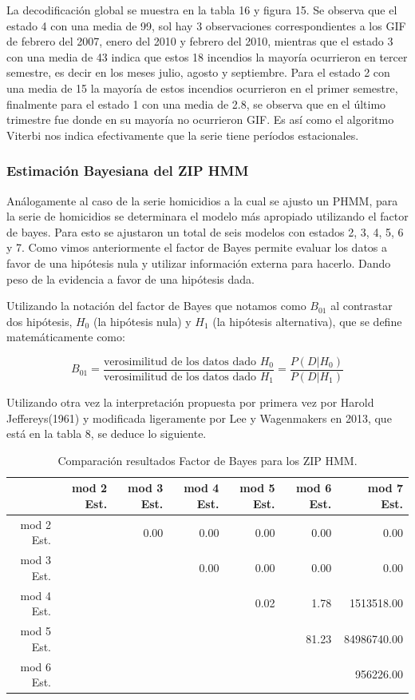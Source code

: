 \documentclass[a4paper]{article}\usepackage[]{graphicx}\usepackage[]{color}
\begin{document}
La decodificación global se muestra en la tabla 16 y figura 15. Se observa que el estado 4 con una media de 99, sol hay 3 observaciones correspondientes a los GIF de febrero del 2007, enero del 2010 y febrero del 2010, mientras que el estado 3 con una media de 43 indica que estos 18 incendios la mayoría ocurrieron en tercer semestre, es decir en los meses julio, agosto y septiembre. Para el estado 2 con una media de 15 la mayoría de estos incendios ocurrieron en el primer semestre, finalmente para el estado 1 con una media de 2.8, se observa que en el último trimestre fue donde en su mayoría no ocurrieron GIF. Es así como el algoritmo Viterbi nos indica efectivamente que la serie tiene períodos estacionales.





\vspace{5mm} %

\subsubsection*{Estimación Bayesiana del ZIP HMM}

Análogamente al caso de la serie homicidios a la cual se ajusto un PHMM, para la serie de homicidios se determinara el modelo más apropiado utilizando el factor de bayes. Para esto se ajustaron un total de seis modelos con estados 2, 3, 4, 5, 6 y 7. Como vimos anteriormente el factor de Bayes permite evaluar los datos a favor de una hipótesis nula y utilizar información externa para hacerlo. Dando peso de la evidencia a favor de una hipótesis dada.

Utilizando la notación del factor de Bayes que notamos como $B_{01}$ al contrastar dos hipótesis, $H_0$ (la hipótesis nula) y $H_1$ (la hipótesis alternativa), que se define matemáticamente como:

$$B_{01} = \frac{\text{verosimilitud de los datos dado $H_0$}}{\text{verosimilitud de los datos dado $H_1$}} = \frac{P(D | H_0)}{P(D | H_1)}$$

Utilizando otra vez la interpretación propuesta por primera vez por Harold Jeffereys(1961) y modificada ligeramente por Lee y Wagenmakers en 2013, que está en la tabla 8, se deduce lo siguiente.

\begin{table}[ht]
\centering
\begin{tabular}{rrrrrrr}
  \hline
 & mod 2 Est. & mod 3 Est. & mod 4 Est. & mod 5 Est. & mod 6 Est. & mod 7 Est. \\ 
  \hline
mod 2 Est. &  & 0.00 & 0.00 & 0.00 & 0.00 & 0.00 \\ 
  mod 3 Est. &  &  & 0.00 & 0.00 & 0.00 & 0.00 \\ 
  mod 4 Est. &  &  &  & 0.02 & 1.78 & 1513518.00 \\ 
  mod 5 Est. &  &  &  &  & 81.23 & 84986740.00 \\ 
  mod 6 Est. &  &  &  &  &  & 956226.00 \\ 
   \hline
\end{tabular}
\caption{Comparación resultados Factor de Bayes para los ZIP HMM.} 
\end{table}
\end{document}
